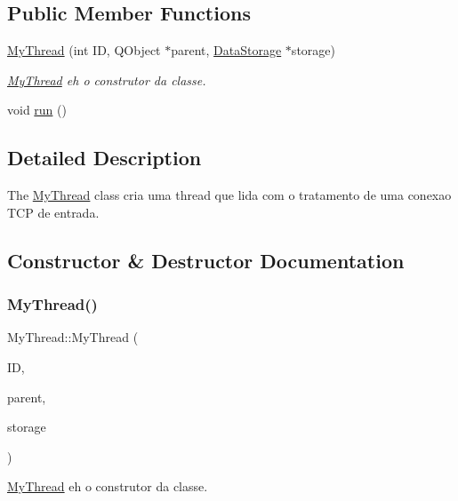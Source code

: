 \subsection*{Public Member Functions}
\begin{DoxyCompactItemize}
\item 
\mbox{\hyperlink{class_my_thread_ac1b04b0fa6b32038e810c7105ef762f6}{My\+Thread}} (int ID, Q\+Object $\ast$parent, \mbox{\hyperlink{class_data_storage}{Data\+Storage}} $\ast$storage)
\begin{DoxyCompactList}\small\item\em \mbox{\hyperlink{class_my_thread}{My\+Thread}} eh o construtor da classe. \end{DoxyCompactList}\item 
void \mbox{\hyperlink{class_my_thread_a48f2e366e852087c53705f64e1ee65c2}{run}} ()
\end{DoxyCompactItemize}


\subsection{Detailed Description}
The \mbox{\hyperlink{class_my_thread}{My\+Thread}} class cria uma thread que lida com o tratamento de uma conexao T\+CP de entrada. 

\subsection{Constructor \& Destructor Documentation}
\mbox{\label{class_my_thread_ac1b04b0fa6b32038e810c7105ef762f6}} 
\subsubsection{\texorpdfstring{My\+Thread()}{MyThread()}}
{\footnotesize\ttfamily My\+Thread\+::\+My\+Thread (\begin{DoxyParamCaption}\item[{int}]{ID,  }\item[{Q\+Object $\ast$}]{parent,  }\item[{\mbox{\hyperlink{class_data_storage}{Data\+Storage}} $\ast$}]{storage }\end{DoxyParamCaption})}



\mbox{\hyperlink{class_my_thread}{My\+Thread}} eh o construtor da classe. 


